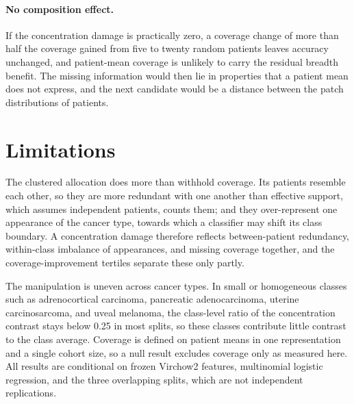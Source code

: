 \documentclass[11pt]{article}
\begin{document}
\paragraph{No composition effect.}
If the concentration damage is practically zero, a coverage change of more than half the coverage gained from five to twenty random patients leaves accuracy unchanged, and patient-mean coverage is unlikely to carry the residual breadth benefit. The missing information would then lie in properties that a patient mean does not express, and the next candidate would be a distance between the patch distributions of patients.



\section{Limitations}
\label{sec:limitations}
The clustered allocation does more than withhold coverage. Its patients resemble each other, so they are more redundant with one another than effective support, which assumes independent patients, counts them; and they over-represent one appearance of the cancer type, towards which a classifier may shift its class boundary. A concentration damage therefore reflects between-patient redundancy, within-class imbalance of appearances, and missing coverage together, and the coverage-improvement tertiles separate these only partly.

The manipulation is uneven across cancer types. In small or homogeneous classes such as adrenocortical carcinoma, pancreatic adenocarcinoma, uterine carcinosarcoma, and uveal melanoma, the class-level ratio of the concentration contrast stays below 0.25 in most splits, so these classes contribute little contrast to the class average. Coverage is defined on patient means in one representation and a single cohort size, so a null result excludes coverage only as measured here. All results are conditional on frozen Virchow2 features, multinomial logistic regression, and the three overlapping splits, which are not independent replications.




\appendix

\end{document}
